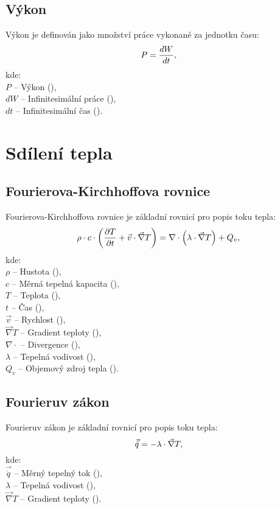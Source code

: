 \documentclass{article}
\begin{document}
\subsection{Výkon}
Výkon je definován jako množství práce vykonané za jednotku času:
\begin{equation}
    P = \frac{dW}{dt},
    \tagaddtext{(\ueqW)}
\end{equation}
kde:\\
$P$ -- Výkon (\ueqW),\\
$dW$ -- Infinitesimální práce (\ueqJ),\\
$dt$ -- Infinitesimální čas (\ueqS).

\newpage



\section{Sdílení tepla}


\subsection{Fourierova-Kirchhoffova rovnice}
Fourierova-Kirchhoffova rovnice je základní rovnicí pro popis toku tepla:
\begin{equation}
    \rho \cdot c \cdot \left( \frac{\partial T}{\partial t} + \vec{v} \cdot \vec{\nabla} T \right) = \nabla \cdot \left( \lambda \cdot \vec{\nabla} T \right) + Q_v,
    \tagaddtext{(\ueqWandMinvcu)}
\end{equation}
kde:\\
$\rho$ -- Hustota (\ueqKGandMinvcu),\\
$c$ -- Měrná tepelná kapacita (\ueqJandKGinvKinv),\\
$T$ -- Teplota (\ueqK),\\
$t$ -- Čas (\ueqS),\\
$\vec{v}$ -- Rychlost (\ueqMandSinv),\\
$\vec{\nabla} T$ -- Gradient teploty (\ueqKandMinv),\\
$\nabla \cdot$ -- Divergence (\ueqMinv),\\
$\lambda$ -- Tepelná vodivost (\ueqWandMinvKinv),\\
$Q_v$ -- Objemový zdroj tepla (\ueqWandMinvcu).


\subsection{Fourieruv zákon}
Fourieruv zákon je základní rovnicí pro popis toku tepla:
\begin{equation}
    \vec{\dot{q}} = - \lambda \cdot \vec{\nabla} T,
    \tagaddtext{(\ueqWandMinvsq)}
\end{equation}
kde:\\
$\vec{\dot{q}}$ -- Měrný tepelný tok (\ueqWandMinvsq),\\
$\lambda$ -- Tepelná vodivost (\ueqWandMinvKinv),\\
$\vec{\nabla} T$ -- Gradient teploty (\ueqKandMinv).
\end{document}
